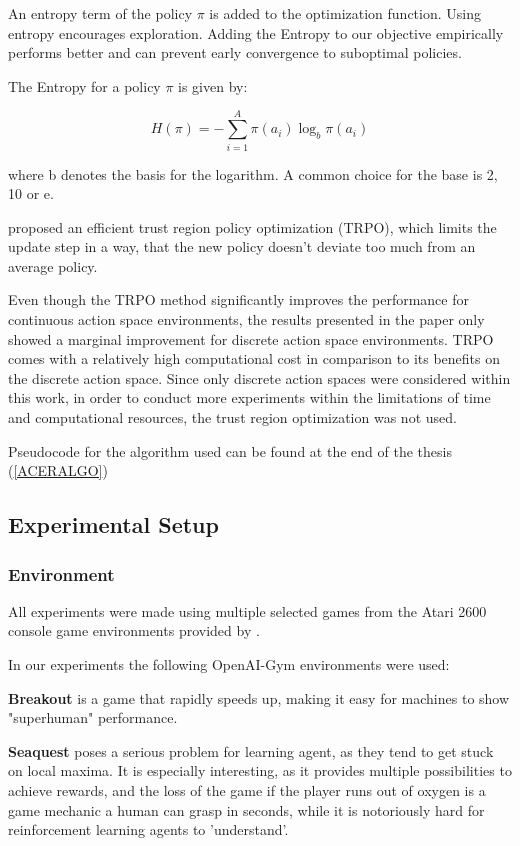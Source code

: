 An entropy term of the policy $\pi$ is added to the optimization function.
Using entropy encourages exploration. Adding the Entropy to our objective empirically performs better and can prevent early convergence to suboptimal policies.

The Entropy for a policy $\pi$ is given by:

\begin{equation}
H(\pi) = -\sum^A_{i=1} \pi(a_i)\log_b \pi(a_i)
\end{equation}

where b denotes the basis for the logarithm. A common choice for the base is 2, 10 or e. \citep{entropy}

\citet{ACER} proposed an efficient trust region policy optimization (TRPO), which limits the update step in a way, that the new policy doesn't deviate too much from an average policy. 

Even though the TRPO method significantly improves the performance for continuous action space environments, the results presented in the paper only showed a marginal improvement for discrete action space environments.
TRPO comes with a relatively high computational cost in comparison to its benefits on the discrete action space.
Since only discrete action spaces were considered within this work, in order to conduct more experiments within the limitations of time and computational resources, the trust region optimization was not used.

Pseudocode for the algorithm used can be found at the end of the thesis (\ref{ACERALGO})

\subsection{Experimental Setup}

\subsubsection{Environment}
All experiments were made using multiple selected games from the Atari 2600 console game environments provided by \citet{openaigym}.

In our experiments the following OpenAI-Gym environments were used:

\textbf{Breakout} is a game that rapidly speeds up, making it easy for machines to show "superhuman" performance.

\textbf{Seaquest} poses a serious problem for learning agent, as they tend to get stuck on local maxima. It is especially interesting, as it provides multiple possibilities to achieve rewards, and the loss of the game if the player runs out of oxygen is a game mechanic a human can grasp in seconds, while it is notoriously hard for reinforcement learning agents to 'understand'.

